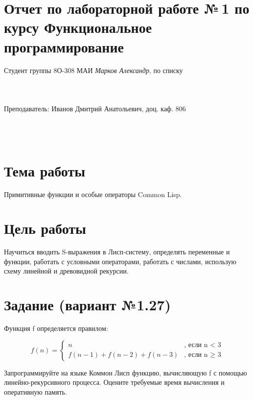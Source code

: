 \documentclass[12pt]{article}
\begin{document}
\section*{Отчет по лабораторной работе №\,1
по курсу \guillemotleft  Функциональное программирование\guillemotright}
\begin{flushright}
Студент группы 8О-308 МАИ \textit{Марков Александр},  по списку \\
 \\
 \\
\ \\
Преподаватель: Иванов Дмитрий Анатольевич, доц. каф. 806 \\
 \\
 \\
 \\

\end{flushright}

\section{Тема работы}
Примитивные функции и особые операторы Common Lisp.

\section{Цель работы}
Научиться вводить S-выражения в Лисп-систему, определять переменные и функции, работать с условными операторами, работать с числами, использую схему линейной и древовидной рекурсии.

\section{Задание (вариант №1.27)}
Функция f определяется правилом:

\begin{equation*}
f(n) =
 \begin{cases}
    n&\text{, если n < 3}\\
    f(n-1) + f(n-2) + f(n-3)&\text{, если n $\geq$ 3}
 \end{cases}
\end{equation*}

Запрограммируйте на языке Коммон Лисп функцию, вычисляющую f с помощью линейно-рекурсивного процесса. Оцените требуемые время вычисления и оперативную память.
\end{document}
